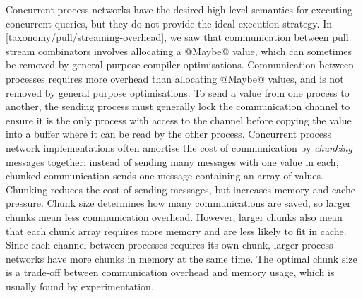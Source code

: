 Concurrent process networks have the desired high-level semantics for executing concurrent queries, but they do not provide the ideal execution strategy.
In \cref{taxonomy/pull/streaming-overhead}, we saw that communication between pull stream combinators involves allocating a @Maybe@ value, which can sometimes be removed by general purpose compiler optimisations.
Communication between processes requires more overhead than allocating @Maybe@ values, and is not removed by general purpose optimisations.
To send a value from one process to another, the sending process must generally lock the communication channel to ensure it is the only process with access to the channel before copying the value into a buffer where it can be read by the other process.
Concurrent process network implementations often amortise the cost of communication by \emph{chunking} messages together: instead of sending many messages with one value in each, chunked communication sends one message containing an array of values.
Chunking reduces the cost of sending messages, but increases memory and cache pressure.
Chunk size determines how many communications are saved, so larger chunks mean less communication overhead.
However, larger chunks also mean that each chunk array requires more memory and are less likely to fit in cache.
Since each channel between processes requires its own chunk, larger process networks have more chunks in memory at the same time.
The optimal chunk size is a trade-off between communication overhead and memory usage, which is usually found by experimentation.



